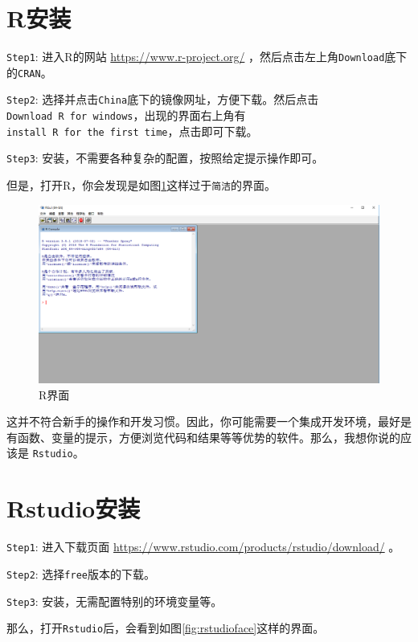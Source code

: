 \documentclass[]{ctexbook}
\begin{document}
\section{R安装}\label{Rinstall}

\texttt{Step1}: 进入R的网站 \url{https://www.r-project.org/}
，然后点击左上角\texttt{Download}底下的\texttt{CRAN}。

\texttt{Step2}:
选择并点击\texttt{China}底下的镜像网址，方便下载。然后点击\texttt{Download\ R\ for\ windows}，出现的界面右上角有\texttt{install\ R\ for\ the\ first\ time}，点击即可下载。

\texttt{Step3}: 安装，不需要各种复杂的配置，按照给定提示操作即可。

但是，打开R，你会发现是如图\ref{fig:rface}这样过于\texttt{简洁}的界面。

\begin{figure}

{\centering \includegraphics[width=0.8\linewidth]{img/R} 

}

\caption{R界面}\label{fig:rface}
\end{figure}

这并不符合新手的操作和开发习惯。因此，你可能需要一个集成开发环境，最好是有函数、变量的提示，方便浏览代码和结果等等优势的软件。那么，我想你说的应该是
\texttt{Rstudio}。

\section{Rstudio安装}\label{Rstudioinstall}

\texttt{Step1}: 进入下载页面
\url{https://www.rstudio.com/products/rstudio/download/} 。

\texttt{Step2}: 选择\texttt{free}版本的下载。

\texttt{Step3}: 安装，无需配置特别的环境变量等。

那么，打开\texttt{Rstudio}后，会看到如图\ref{fig:rstudioface}这样的界面。
\end{document}

